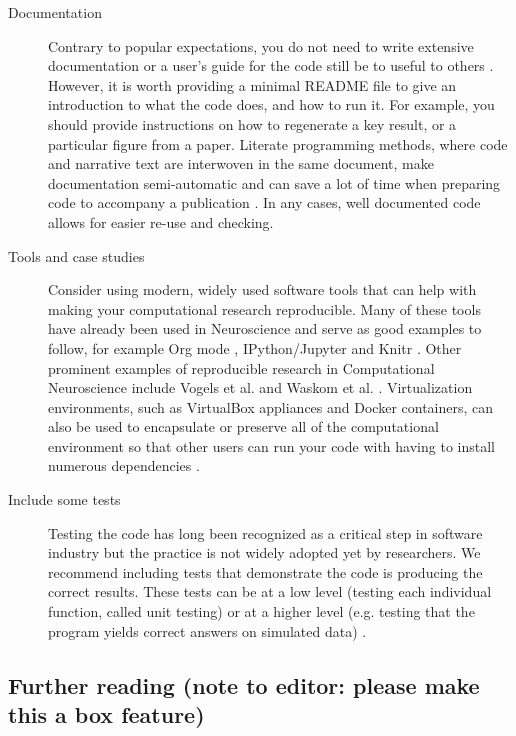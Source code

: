 \documentclass[11pt]{article}
\begin{document}
\begin{description}
\item [Documentation] Contrary to popular expectations, you do not
  need to write extensive documentation or a user's guide for the code
  still be to useful to others \cite{Barnes2010-iv}.  However, it is
  worth providing a minimal README file to give an introduction to
  what the code does, and how to run it.  For example, you should provide
  instructions on how to regenerate a key result, or a particular
  figure from a paper. Literate programming methods, where code and narrative text are interwoven in the same document, make documentation semi-automatic and can save a lot of time when preparing code to accompany a publication \cite{schulte2012multi, gentleman2012statistical}. In any cases, well documented code allows for easier re-use and checking.

\item [Tools and case studies] Consider using modern, widely used software tools that can help with making your computational research reproducible.  Many of
  these tools have already been used in Neuroscience and serve as good
  examples to follow, for example Org mode \cite{Delescluse2011},
  IPython/Jupyter \cite{Stevens2013} and Knitr \cite{Eglen2014}.  Other
  prominent examples of reproducible research in Computational
  Neuroscience include Vogels et al. \cite{Vogels2011-c8c} and Waskom et al. \cite{Waskom2014-gd}.
  Virtualization environments, such as VirtualBox appliances and
  Docker containers, can also be used to
  encapsulate or preserve all of the computational environment so that
  other users can run your code with having to install numerous dependencies \cite{Boettiger2015}.

\item [Include some tests] Testing the code has long been recognized
  as a critical step in software industry but the practice is not
  widely adopted yet by researchers. We recommend including tests that
  demonstrate the code is producing the correct
  results\cite{Axelrod2014-xi}. These tests can be at a low level
  (testing each individual function, called unit testing) or at a
  higher level (e.g. testing that the program yields correct answers
  on simulated data) \cite{wilson_best_2014}.

\end{description}

\subsection*{Further reading (note to editor: please make this a box feature)}
\end{document}
